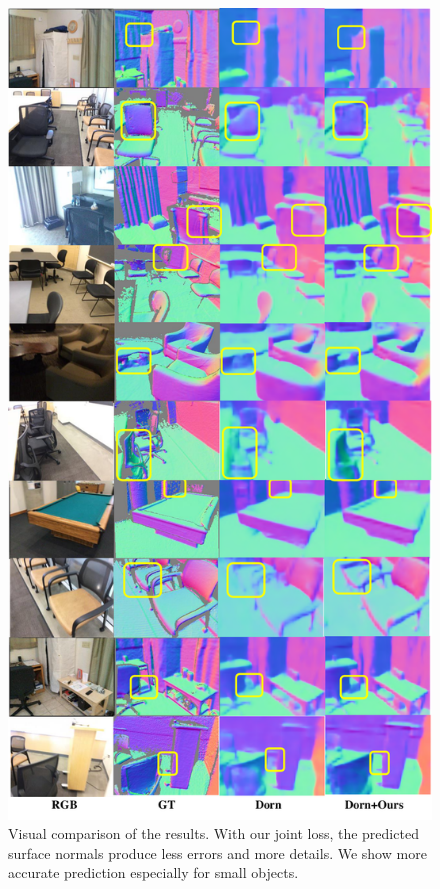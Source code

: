 \begin{figure}
\begin{minipage}{0.49\linewidth}
    \centering
    \includegraphics[width=\linewidth]{FrameNet/graph/normal-supplemental.pdf}
    \caption{Visual comparison of the results. With our joint loss, the predicted surface normals produce less errors and more details. We show more accurate prediction especially for small objects.}

\end{minipage}
\end{figure}
